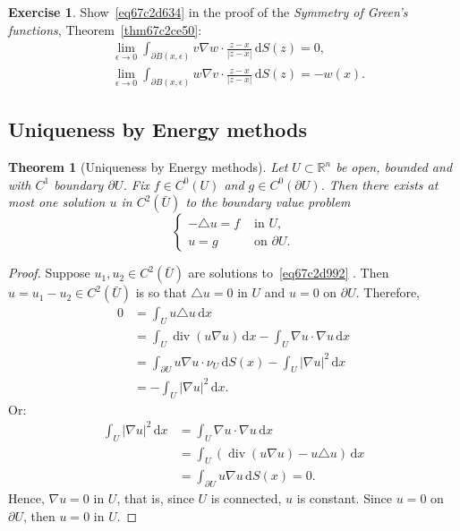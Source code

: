 \documentclass[a4paper,9pt]{amsart}
\newcommand{\R}{\mathbb{R}}	%
\newcommand{\did}{\,\mathrm{d}}	%
\newcommand{\de}{\partial}		%
\renewcommand{\div}{\operatorname{div}}	%
\newcommand{\laplacian}{\triangle}
\newcommand{\grad}{\nabla}
\theoremstyle{plain}
\newtheorem{theorem}[proposition]{Theorem}
\theoremstyle{definition}
\newtheorem{exercise}[proposition]{Exercise}%
\theoremstyle{remark}
\begin{document}
\begin{exercise}
	Show~\eqref{eq67c2d634} in the proof of the {\it Symmetry of Green's functions}, Theorem~\ref{thm67c2ce50}:
	\begin{equation*}%
	\begin{aligned}
		&\lim_{\epsilon\to 0}
		\int_{\de B(x,\epsilon)} v\grad w \cdot \frac{z-x}{|z-x|} \did S(z)
		= 0 ,\\
		&\lim_{\epsilon\to 0}
		\int_{\de B(x,\epsilon)}  w\grad v\cdot \frac{z-x}{|z-x|} \did S(z)
		= - w(x) .
	\end{aligned}
	\end{equation*}
\end{exercise}

\subsection{Uniqueness by Energy methods}\label{subs67c2d8ed}

\begin{theorem}[Uniqueness by Energy methods]\label{thm67c2d8f8}
	Let $U\subset\R^n$ be open, bounded and with $C^1$ boundary $\de U$.
	Fix $f\in C^0(U)$ and $g\in C^0(\de U)$.
	Then there exists at most one solution $u$ in $C^2(\bar U)$ to the boundary value problem
	\begin{equation}\label{eq67c2d992}
	\begin{cases}
		- \laplacian u = f & \text{ in }U , \\
		u = g & \text{ on }\de U .
	\end{cases}
	\end{equation}
\end{theorem}
\begin{proof}
	Suppose $u_1,u_2\in C^2(\bar U)$ are solutions to~\eqref{eq67c2d992} .
	Then $u = u_1-u_2\in C^2(\bar U)$ is so that $\laplacian u =0$ in $U$ and $u=0$ on $\de U$.
	Therefore,
	\begin{align*}
		0
		&= \int_U u\laplacian u \did x \\
		&= \int_U \div(u \grad u) \did x - \int_U \grad u\cdot\grad u \did x \\
		&= \int_{\de U} u \grad u\cdot\nu_U \did S(x) - \int_U |\grad u|^2 \did x \\
		&= - \int_U |\grad u|^2 \did x .
	\end{align*}
	Or:
	\begin{align*}
		\int_U|\grad u|^2 \did x
		&= \int_U \grad u\cdot\grad u \did x \\
		&= \int_U (\div(u\grad u) - u \laplacian u) \did x \\
		&= \int_{\de U} u\grad u \did S(x) 
		= 0 .
	\end{align*}
	Hence, $\grad u = 0 $ in $U$, that is, since $U$ is connected, $u$ is constant.
	Since $u=0$ on $\de U$, then $u=0$ in $U$.
	

\end{proof}
\end{document}
